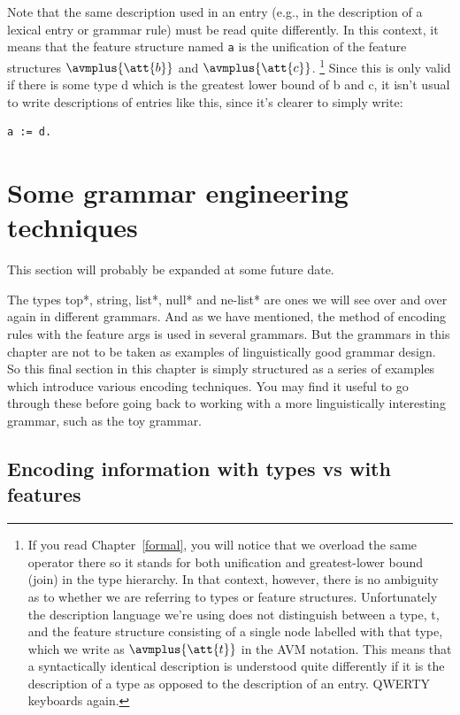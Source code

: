 \documentclass[12pt]{report}
\begin{document}
Note that the same description used in an entry (e.g., in the 
description of a lexical entry or grammar rule) must be read quite
differently.  In this context, it
means that the feature structure named {\tt a} is the unification of
the feature structures {\tiny $\avmplus{\att{b}}$} and {\tiny $\avmplus{\att{c}}$}.
\footnote{If you read Chapter~\ref{formal},
you will notice that we overload the same operator there
so it stands for both unification and greatest-lower bound
(join) in the type
hierarchy.  In that context, however, there is no ambiguity
as to whether we are referring to types or feature
structures.  Unfortunately the description language we're using
does not distinguish between a type, {\type t}, and the feature structure 
consisting of a single node labelled with that type, which we write as
{\tiny $\avmplus{\att{t}}$} in the AVM notation.  
This means that a syntactically
identical description is understood quite differently if it is the 
description of a type as opposed to the description of an entry.  
QWERTY keyboards
again.} 
Since this is only valid if there is some type {\type d}
which is the greatest lower bound
of {\type b} and {\type c}, it isn't usual to write descriptions of entries like
this, since it's clearer to simply write:
\begin{verbatim}
a := d.
\end{verbatim}



\section{Some grammar engineering techniques}

This section will probably be expanded at some
future date.

The types {\type *top*}, {\type string}, {\type *list*}, {\type *null*}
and {\type *ne-list*} are ones we will see over and over again
in different grammars.  And as we have
mentioned, the method of encoding rules
with the feature {\feature args} is used in several grammars.  
But the grammars in this chapter are not 
to be taken as examples of linguistically good grammar
design.  So this final section in this chapter is
simply structured as 
a series of examples which introduce various encoding
techniques.
You may find it useful to go through these before going back to
working with a more linguistically
interesting grammar, such as the toy grammar.

\subsection{Encoding information with types vs with features} 
\end{document}
